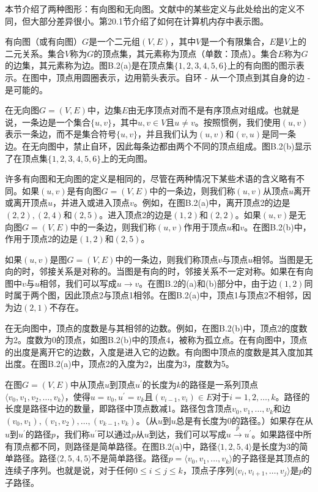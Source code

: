\documentclass[lang=cn,newtx,10pt,scheme=chinese]{elegantbook}
\begin{document}
本节介绍了两种图形：有向图和无向图。文献中的某些定义与此处给出的定义不同，但大部分差异很小。第20.1节介绍了如何在计算机内存中表示图。

有向图（或有向图）$G$是一个二元组$(V, E)$，其中$V$是一个有限集合，$E$是$V$上的二元关系。集合$V$称为$G$的顶点集，其元素称为顶点（单数：顶点）。集合$E$称为$G$的边集，其元素称为边。图B.2(a)是在顶点集$\{1,2,3,4,5,6\}$上的有向图的图示表示。在图中，顶点用圆圈表示，边用箭头表示。自环 - 从一个顶点到其自身的边 - 是可能的。

在无向图$G=(V, E)$中，边集$E$由无序顶点对而不是有序顶点对组成。也就是说，一条边是一个集合$\{u, v\}$，其中$u,v \in V$且$u \neq v$。按照惯例，我们使用$(u,v)$表示一条边，而不是集合符号$\{u,v\}$，并且我们认为$(u,v)$和$(v,u)$是同一条边。在无向图中，禁止自环，因此每条边都由两个不同的顶点组成。图B.2(b)显示了在顶点集$\{1,2,3,4,5,6\}$上的无向图。

许多有向图和无向图的定义是相同的，尽管在两种情况下某些术语的含义略有不同。如果$(u,v)$是有向图$G=(V,E)$中的一条边，则我们称$(u,v)$从顶点$u$离开或离开顶点$u$，并进入或进入顶点$v$。例如，在图B.2(a)中，离开顶点2的边是$(2,2),(2,4)$和$(2,5)$。进入顶点2的边是$(1,2)$和$(2,2)$。如果$(u,v)$是无向图$G=(V,E)$中的一条边，则我们称$(u,v)$作用于顶点$u$和$v$。在图B.2(b)中，作用于顶点2的边是$(1,2)$和$(2,5)$。

如果$(u,v)$是图$G=(V,E)$中的一条边，则我们称顶点$v$与顶点$u$相邻。当图是无向的时，邻接关系是对称的。当图是有向的时，邻接关系不一定对称。如果在有向图中$v$与$u$相邻，我们可以写成$u\rightarrow v$。在图B.2的(a)和(b)部分中，由于边$(1,2)$同时属于两个图，因此顶点2与顶点1相邻。在图B.2(a)中，顶点1与顶点2不相邻，因为边$(2,1)$不存在。

在无向图中，顶点的度数是与其相邻的边数。例如，在图B.2(b)中，顶点2的度数为2。度数为0的顶点，如图B.2(b)中的顶点4，被称为孤立点。在有向图中，顶点的出度是离开它的边数，入度是进入它的边数。有向图中顶点的度数是其入度加其出度。在图B.2(a)中，顶点2的入度为2，出度为3，度数为5。

在图$G=(V,E)$中从顶点$u$到顶点$u^{\prime}$的长度为$k$的路径是一系列顶点$\langle v_0,v_1,v_2,\ldots,v_k\rangle$，使得$u=v_0,u^{\prime}=v_k$且$(v_{i-1},v_i)\in E$对于$i=1,2,\ldots,k$。路径的长度是路径中边的数量，即路径中顶点数减1。路径包含顶点$v_0,v_1,\ldots,v_k$和边$(v_0,v_1),(v_1,v_2),\ldots,(v_{k-1},v_k)$。（从$u$到$u$总是有长度为0的路径。）如果存在从$u$到$u^{\prime}$的路径$p$，我们称$u^{\prime}$可以通过$p$从$u$到达，我们可以写成$u\stackrel{p}{\longrightarrow}u^{\prime}$。如果路径中所有顶点都不同，则路径是简单路径。在图B.2(a)中，路径$\langle 1,2,5,4\rangle$是长度为3的简单路径。路径$\langle 2,5,4,5\rangle$不是简单路径。路径$p=\langle v_0,v_1,\ldots,v_k\rangle$的子路径是其顶点的连续子序列。也就是说，对于任何$0 \leq i \leq j \leq k$，顶点子序列$\langle v_i,v_{i+1},\ldots,v_j\rangle$是$p$的子路径。
\end{document}
